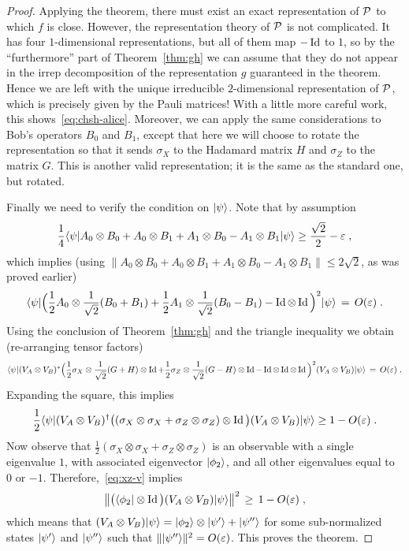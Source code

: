 \begin{proof}
Applying the theorem, there must exist an exact representation of $\mathcal{P}$ to which $f$ is close. However, the representation theory of $\mathcal{P}$ is not complicated. It has four $1$-dimensional representations, but all of them map $-\mathop{\rm Id}\nolimits$ to $1$, so by the ``furthermore'' part of Theorem~\ref{thm:gh} we can assume that they do not appear in the irrep decomposition of the representation $g$ guaranteed in the theorem. Hence we are left with the unique irreducible $2$-dimensional representation of $\mathcal{P}$, which is precisely given by the Pauli matrices! With a little more careful work, this shows~\eqref{eq:chsh-alice}. Moreover, we can apply the  same considerations to Bob's operators $B_0$ and $B_1$, except that here we will choose to rotate the representation so that it sends $\sigma_X$ to the Hadamard matrix $H$ and $\sigma_Z$ to the matrix $G$. This is another valid representation; it is the same as the standard one, but rotated. 

Finally we need to verify the condition on $|\psi\rangle$. Note that by assumption 
$$ \frac{1}{4}\langle\psi| A_0 \otimes B_0 + A_0 \otimes B_1 + A_1 \otimes B_0 - A_1\otimes B_1 |\psi\rangle \geq \frac{\sqrt{2}}{2} - \varepsilon\;,$$
which implies (using $\|A_0 \otimes B_0 + A_0 \otimes B_1 + A_1 \otimes B_0 - A_1\otimes B_1\|\leq 2\sqrt{2}$, as was proved earlier) 
\[ \langle\psi|\Big( \frac{1}{2} A_0\otimes \frac{1}{\sqrt{2}}(B_0+B_1) +\frac{1}{2} A_1 \otimes \frac{1}{\sqrt{2}}(B_0-B_1)-\mathop{\rm Id}\nolimits\otimes\mathop{\rm Id}\nolimits\Big)^2|\psi\rangle \,=\, O(\varepsilon)\;.\]
Using the conclusion of Theorem~\ref{thm:gh} and the triangle inequality we obtain (re-arranging tensor factors) 
\[ \langle\psi|(V_A\otimes V_B)^*\Big( \frac{1}{2} \sigma_X\otimes \frac{1}{\sqrt{2}}(G+H)\otimes \mathop{\rm Id}\nolimits +\frac{1}{2} \sigma_Z \otimes \frac{1}{\sqrt{2}}(G-H)\otimes \mathop{\rm Id}\nolimits-\mathop{\rm Id}\nolimits\otimes\mathop{\rm Id}\nolimits\otimes \mathop{\rm Id}\nolimits\Big)^2(V_A\otimes V_B)|\psi\rangle \,=\, O(\varepsilon)\;.\]
Expanding the square, this implies
\begin{equation}\label{eq:xz-v}
\frac{1}{2}\langle\psi|(V_A\otimes V_B)^\dagger \big( (\sigma_X \otimes \sigma_X + \sigma_Z \otimes \sigma_Z )\otimes \mathop{\rm Id}\nolimits\big)(V_A\otimes V_B)|\psi\rangle \geq 1 - O({\varepsilon})\;.
\end{equation}
Now observe that $\frac{1}{2}(\sigma_X \otimes \sigma_X + \sigma_Z \otimes \sigma_Z )$ is an observable with a single eigenvalue $1$, with associated eigenvector $|\phi_2\rangle$, and all other eigenvalues equal to $0$ or $-1$. Therefore,~\eqref{eq:xz-v} implies 
\[ \big\|\big(\langle\phi_2|\otimes \mathop{\rm Id}\nolimits\big)(V_A\otimes V_B)|\psi\rangle\big\|^2 \,\geq\, 1-O({\varepsilon})\;,\]
which means that $(V_A\otimes V_B)|\psi\rangle = |\phi_2\rangle \otimes |\psi'\rangle + |\psi''\rangle$ for some sub-normalized states $|\psi'\rangle$ and $|\psi''\rangle$ such that $\||\psi''\rangle\|^2 = O({\varepsilon})$. This proves the theorem. 
\end{proof}

